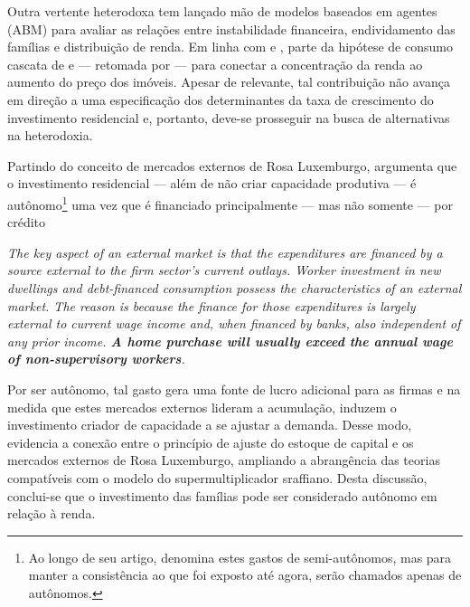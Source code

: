 Outra vertente heterodoxa tem lançado mão de modelos baseados em agentes (ABM) para avaliar as relações entre instabilidade financeira, endividamento das famílias e distribuição de renda.
Em linha com \textcite{cynamon_inequality_2013} e \textcite{erlingsson_integrating_2013}, \textcite{cardaci_inequality_2018} parte da hipótese de consumo cascata de \textcite{veblen_theory_1899} e \textcite{duesenberry_income_1949} --- retomada por \textcite{frank_expenditure_2014} --- para conectar a concentração da renda ao aumento do preço dos imóveis.
Apesar de relevante, tal contribuição não avança em direção a uma especificação dos determinantes da taxa de crescimento do investimento residencial e, portanto, deve-se prosseguir na busca de alternativas na heterodoxia.

Partindo do conceito de mercados externos de Rosa Luxemburgo, \textcite{fiebiger_semi-autonomous_2018} argumenta que o investimento residencial --- além de não criar capacidade produtiva --- é autônomo\footnote{
	Ao longo de seu artigo, \textcite{fiebiger_semi-autonomous_2018} denomina estes gastos de semi-autônomos, mas para manter a consistência ao que foi exposto até agora, serão chamados apenas de autônomos.
} uma vez que é financiado principalmente --- mas não somente --- por crédito

\begin{citacao}
	\textit{The key aspect of an external market is that the expenditures
		are financed by a source external to the firm sector’s current outlays. Worker investment in new dwellings and debt-financed consumption possess the characteristics of
		an external market. The reason is because the finance for those expenditures is largely
		external to current wage income and, when financed by banks, also independent of any
		prior income. \textbf{A home purchase will usually exceed the annual wage of non-supervisory
			workers}.
	}
	\cite[p.~3, grifos adicionados]{fiebiger_semi-autonomous_2018}
\end{citacao}
Por ser autônomo, tal gasto gera uma fonte de lucro adicional para as firmas e na medida que estes mercados externos lideram a acumulação, induzem o investimento criador de capacidade a se ajustar a demanda.
Desse modo, \textcite{fiebiger_semi-autonomous_2018} evidencia a conexão entre o princípio de ajuste do estoque de capital e os mercados externos de Rosa Luxemburgo, ampliando a abrangência das teorias compatíveis com o modelo do supermultiplicador sraffiano.
Desta discussão, conclui-se que o investimento das famílias pode ser considerado autônomo em relação à renda. 

